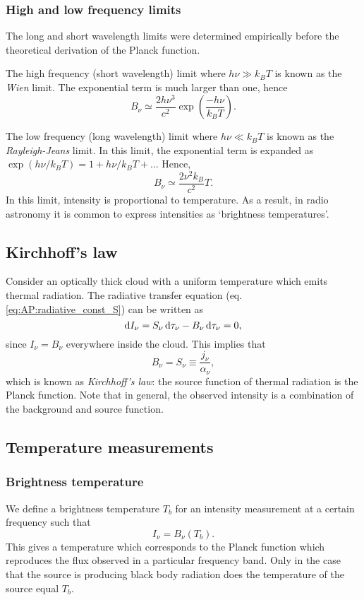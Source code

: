 \subsubsection{High and low frequency limits}
The long and short wavelength limits were determined empirically before the theoretical derivation of the Planck function.
\par 
The high frequency (short wavelength) limit where $h\nu \gg k_B T$ is known as the \emph{Wien} limit.
 The exponential term is much larger than one, hence
%
\begin{equation}
	B_\nu \simeq \frac{2 h \nu^3}{c^2} \exp\left(\frac{-h\nu}{k_BT}\right).
	\label{eq:AP:wien_limit}
\end{equation}
%
\par 
The low frequency (long wavelength) limit where $h\nu \ll k_B T$ is known as the \emph{Rayleigh-Jeans} limit.
 In this limit, the exponential term is expanded as $\exp \left( h\nu/k_BT \right) = 1 + h\nu/k_BT + ...$ Hence,
%
\begin{equation}
	B_\nu \simeq \frac{2 \nu^2 k_B}{c^2} T.
	\label{eq:AP:rayleigh_jeans_limit}
\end{equation}
%
In this limit, intensity is proportional to temperature.
 As a result, in radio astronomy it is common to express intensities as `brightness temperatures'.
%
%
\subsection{Kirchhoff's law}
Consider an optically thick cloud with a uniform temperature which emits thermal radiation.
 The radiative transfer equation (eq. \ref{eq:AP:radiative_const_S}) can be written as
%
\[ \mathop{}\!\mathrm{d} I_\nu = S_\nu \mathop{}\!\mathrm{d} \tau_\nu - B_\nu \mathop{}\!\mathrm{d} \tau_\nu = 0, \]
%
since \( I_\nu = B_\nu \) everywhere inside the cloud.
 This implies that
%
\begin{equation}
	B_\nu = S_\nu \equiv \frac{j_\nu}{\alpha_\nu},
	\label{eq:AP:kirchhoff's_law}
\end{equation}
%
which is known as \emph{Kirchhoff's law}: the source function of thermal radiation is the Planck function.
 Note that in general, the observed intensity is a combination of the background and source function.
%
%
\subsection{Temperature measurements}
\subsubsection{Brightness temperature}
We define a brightness temperature \(T_b\) for an intensity measurement at a certain frequency such that
%
\begin{equation}
	I_\nu = B_\nu (T_b).
	\label{eq:AP:brightness_temp}
\end{equation}
%
This gives a temperature which corresponds to the Planck function which reproduces the flux observed in a particular frequency band.
 Only in the case that the source is producing black body radiation does the temperature of the source equal \(T_b\).
%
